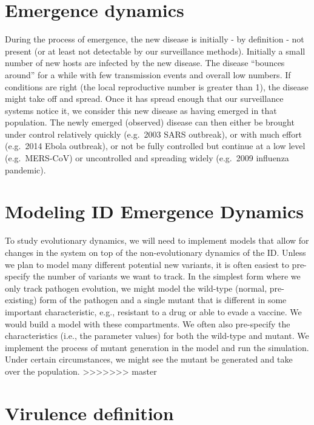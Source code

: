 \documentclass[]{book}
\theoremstyle{definition}
\theoremstyle{definition}
\theoremstyle{definition}
\theoremstyle{remark}
\begin{document}
\section{Emergence dynamics}\label{emergence-dynamics}

During the process of emergence, the new disease is initially - by
definition - not present (or at least not detectable by our surveillance
methods). Initially a small number of new hosts are infected by the new
disease. The disease ``bounces around'' for a while with few
transmission events and overall low numbers. If conditions are right
(the local reproductive number is greater than 1), the disease might
take off and spread. Once it has spread enough that our surveillance
systems notice it, we consider this new disease as having emerged in
that population. The newly emerged (observed) disease can then either be
brought under control relatively quickly (e.g.~2003 SARS outbreak), or
with much effort (e.g.~2014 Ebola outbreak), or not be fully controlled
but continue at a low level (e.g.~MERS-CoV) or uncontrolled and
spreading widely (e.g.~2009 influenza pandemic).

\section{Modeling ID Emergence
Dynamics}\label{modeling-id-emergence-dynamics}

To study evolutionary dynamics, we will need to implement models that
allow for changes in the system on top of the non-evolutionary dynamics
of the ID. Unless we plan to model many different potential new
variants, it is often easiest to pre-specify the number of variants we
want to track. In the simplest form where we only track pathogen
evolution, we might model the wild-type (normal, pre-existing) form of
the pathogen and a single mutant that is different in some important
characteristic, e.g., resistant to a drug or able to evade a vaccine. We
would build a model with these compartments. We often also pre-specify
the characteristics (i.e., the parameter values) for both the wild-type
and mutant. We implement the process of mutant generation in the model
and run the simulation. Under certain circumstances, we might see the
mutant be generated and take over the population.
>>>>>>> master

\hypertarget{virulence-definition}{%
\section{Virulence definition}\label{virulence-definition}}
\end{document}
